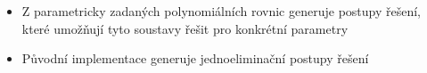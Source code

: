 \documentclass[cmpiitalkstyle, 25pt]{cmptalk}
\begin{document}
\begin{cmptalkslide}
  \begin{itemize}
    \item Z parametricky zadaných polynomiálních rovnic generuje postupy řešení, které umožňují tyto soustavy řešit pro konkrétní parametry
    \item Původní implementace \cite{AutoGen} generuje jednoeliminační postupy řešení
  \end{itemize}


\end{cmptalkslide}
\end{document}
